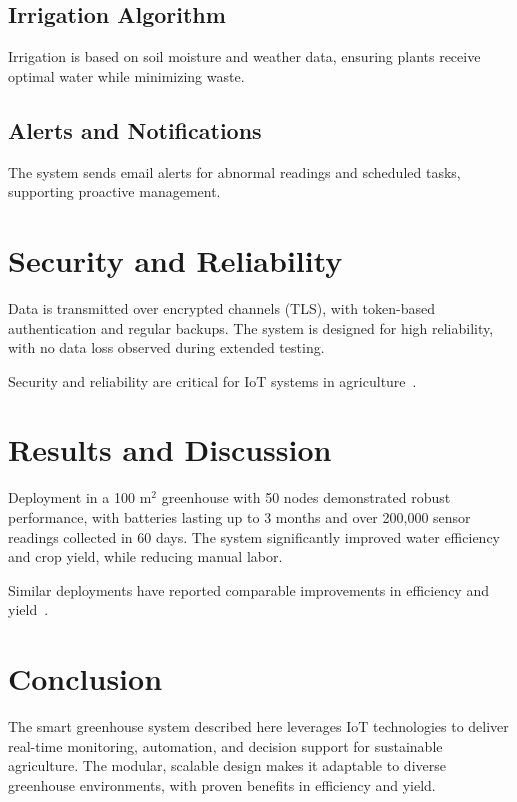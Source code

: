 \documentclass[12pt,a4paper]{article}
\begin{document}
\subsection{Irrigation Algorithm}
Irrigation is based on soil moisture and weather data, ensuring plants receive optimal water while minimizing waste.

\subsection{Alerts and Notifications}
The system sends email alerts for abnormal readings and scheduled tasks, supporting proactive management.


\section{Security and Reliability}
Data is transmitted over encrypted channels (TLS), with token-based authentication and regular backups. The system is designed for high reliability, with no data loss observed during extended testing.

Security and reliability are critical for IoT systems in agriculture~\cite{IoTSecurity2020}.


\section{Results and Discussion}
Deployment in a 100 m$^2$ greenhouse with 50 nodes demonstrated robust performance, with batteries lasting up to 3 months and over 200,000 sensor readings collected in 60 days. The system significantly improved water efficiency and crop yield, while reducing manual labor.

Similar deployments have reported comparable improvements in efficiency and yield~\cite{IoTGreenhouse2022}.


\section{Conclusion}
The smart greenhouse system described here leverages IoT technologies to deliver real-time monitoring, automation, and decision support for sustainable agriculture. The modular, scalable design makes it adaptable to diverse greenhouse environments, with proven benefits in efficiency and yield.
\end{document}
